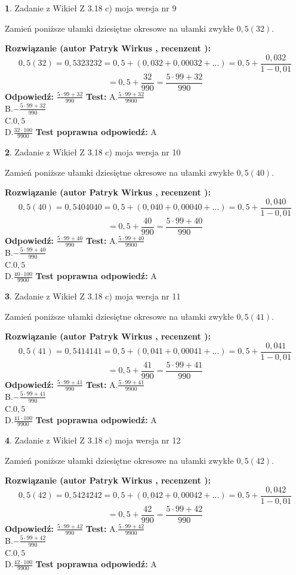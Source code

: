 \documentclass[12pt, a4paper]{article}
\theoremstyle{definition} %
\newtheorem{zad}{}
\newcommand{\zadStart}[1]{\begin{zad}#1\newline}
\newcommand{\zadStop}{\end{zad}}
\newcommand{\rozwStart}[2]{\noindent \textbf{Rozwiązanie (autor #1 , recenzent #2): }\newline}
\newcommand{\rozwStop}{\newline}
\newcommand{\odpStart}{\noindent \textbf{Odpowiedź:}\newline}
\newcommand{\odpStop}{\newline}
\newcommand{\testStart}{\noindent \textbf{Test:}\newline}
\newcommand{\testStop}{\newline}
\newcommand{\kluczStart}{\noindent \textbf{Test poprawna odpowiedź:}\newline}
\newcommand{\kluczStop}{\newline}
\begin{document}
\zadStart{Zadanie z Wikieł Z 3.18 c) moja wersja nr 9}

Zamień poniższe ułamki dziesiętne okresowe na ułamki zwykłe $0,5(32)$.
\zadStop
\rozwStart{Patryk Wirkus}{}
$$0,5(32)=0,5323232=0,5+(0,032+0,00032+...)=0,5+\frac{0,032}{1-0,01}$$
$$=0,5+\frac{32}{990}=\frac{5\cdot99+32}{990}$$
\rozwStop
\odpStart
$\frac{5\cdot99+32}{990}$
\odpStop
\testStart
A.$\frac{5\cdot99+32}{9900}$\\ B.$-\frac{5\cdot99+32}{990}$\\ C.$0,5$\\ D.$\frac{32\cdot100}{9900}$
\testStop
\kluczStart
A
\kluczStop



\zadStart{Zadanie z Wikieł Z 3.18 c) moja wersja nr 10}

Zamień poniższe ułamki dziesiętne okresowe na ułamki zwykłe $0,5(40)$.
\zadStop
\rozwStart{Patryk Wirkus}{}
$$0,5(40)=0,5404040=0,5+(0,040+0,00040+...)=0,5+\frac{0,040}{1-0,01}$$
$$=0,5+\frac{40}{990}=\frac{5\cdot99+40}{990}$$
\rozwStop
\odpStart
$\frac{5\cdot99+40}{990}$
\odpStop
\testStart
A.$\frac{5\cdot99+40}{9900}$\\ B.$-\frac{5\cdot99+40}{990}$\\ C.$0,5$\\ D.$\frac{40\cdot100}{9900}$
\testStop
\kluczStart
A
\kluczStop



\zadStart{Zadanie z Wikieł Z 3.18 c) moja wersja nr 11}

Zamień poniższe ułamki dziesiętne okresowe na ułamki zwykłe $0,5(41)$.
\zadStop
\rozwStart{Patryk Wirkus}{}
$$0,5(41)=0,5414141=0,5+(0,041+0,00041+...)=0,5+\frac{0,041}{1-0,01}$$
$$=0,5+\frac{41}{990}=\frac{5\cdot99+41}{990}$$
\rozwStop
\odpStart
$\frac{5\cdot99+41}{990}$
\odpStop
\testStart
A.$\frac{5\cdot99+41}{9900}$\\ B.$-\frac{5\cdot99+41}{990}$\\ C.$0,5$\\ D.$\frac{41\cdot100}{9900}$
\testStop
\kluczStart
A
\kluczStop



\zadStart{Zadanie z Wikieł Z 3.18 c) moja wersja nr 12}

Zamień poniższe ułamki dziesiętne okresowe na ułamki zwykłe $0,5(42)$.
\zadStop
\rozwStart{Patryk Wirkus}{}
$$0,5(42)=0,5424242=0,5+(0,042+0,00042+...)=0,5+\frac{0,042}{1-0,01}$$
$$=0,5+\frac{42}{990}=\frac{5\cdot99+42}{990}$$
\rozwStop
\odpStart
$\frac{5\cdot99+42}{990}$
\odpStop
\testStart
A.$\frac{5\cdot99+42}{9900}$\\ B.$-\frac{5\cdot99+42}{990}$\\ C.$0,5$\\ D.$\frac{42\cdot100}{9900}$
\testStop
\kluczStart
A
\kluczStop
\end{document}
